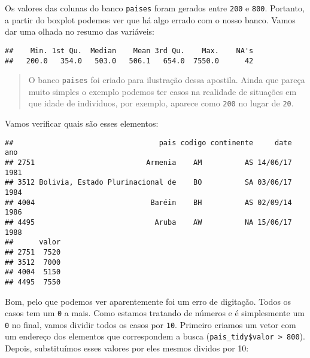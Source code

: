 \documentclass[]{book}
\newenvironment{Shaded}{\begin{snugshade}}{\end{snugshade}}
\newcommand{\DecValTok}[1]{\textcolor[rgb]{0.00,0.00,0.81}{#1}}
\newcommand{\KeywordTok}[1]{\textcolor[rgb]{0.13,0.29,0.53}{\textbf{#1}}}
\newcommand{\NormalTok}[1]{#1}
\newcommand{\OperatorTok}[1]{\textcolor[rgb]{0.81,0.36,0.00}{\textbf{#1}}}
\newcommand{\StringTok}[1]{\textcolor[rgb]{0.31,0.60,0.02}{#1}}
\theoremstyle{definition}
\theoremstyle{definition}
\theoremstyle{definition}
\theoremstyle{remark}
\begin{document}
Os valores das colunas do banco \texttt{paises} foram gerados entre \texttt{200} e \texttt{800}. Portanto, a partir do boxplot podemos ver que há algo errado com o nosso banco. Vamos dar uma olhada no resumo das variáveis:

\begin{verbatim}
##    Min. 1st Qu.  Median    Mean 3rd Qu.    Max.    NA's 
##   200.0   354.0   503.0   506.1   654.0  7550.0      42
\end{verbatim}

\begin{quote}
O banco \texttt{paises} foi criado para ilustração dessa apostila. Ainda que pareça muito simples o exemplo podemos ter casos na realidade de situações em que idade de indivíduos, por exemplo, aparece como \texttt{200} no lugar de \texttt{20}.
\end{quote}

Vamos verificar quais são esses elementos:

\begin{Shaded}
\end{Shaded}

\begin{verbatim}
##                                  pais codigo continente     date  ano
## 2751                          Armenia    AM          AS 14/06/17 1981
## 3512 Bolivia, Estado Plurinacional de    BO          SA 03/06/17 1984
## 4004                           Baréin    BH          AS 02/09/14 1986
## 4495                            Aruba    AW          NA 15/06/17 1988
##      valor
## 2751  7520
## 3512  7000
## 4004  5150
## 4495  7550
\end{verbatim}

Bom, pelo que podemos ver aparentemente foi um erro de digitação. Todos os casos tem um \texttt{0} a mais. Como estamos tratando de números e é simplesmente um \texttt{0} no final, vamos dividir todos os casos por \texttt{10}. Primeiro criamos um vetor com um endereço dos elementos que correspondem a busca (\texttt{pais\_tidy\$valor\ \textgreater{}\ 800}). Depois, substituímos esses valores por eles mesmos dividos por 10:

\begin{Shaded}
\end{Shaded}
\end{document}
